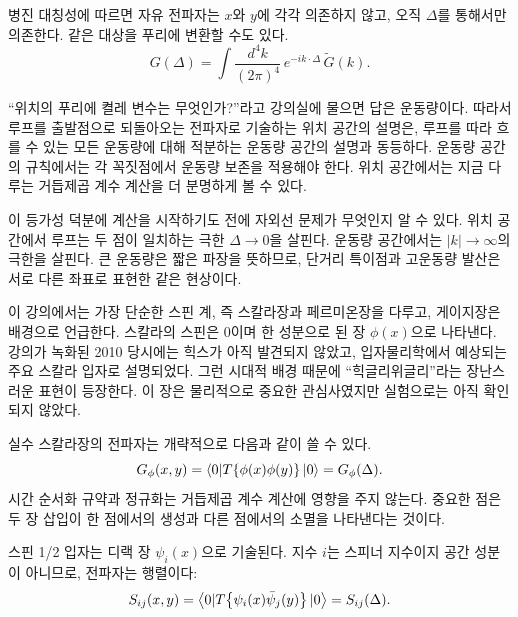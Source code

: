 병진 대칭성에 따르면 자유 전파자는 \(x\)와 \(y\)에 각각 의존하지 않고, 오직 \(\Delta\)를 통해서만 의존한다. 같은 대상을 푸리에 변환할 수도 있다.
\begin{equation}
G(\Delta)
=\int\frac{d^4k}{(2\pi)^4}\,e^{-ik\cdot\Delta}\,\widetilde G(k).
\end{equation}

``위치의 푸리에 켤레 변수는 무엇인가?''라고 강의실에 물으면 답은 운동량이다. 따라서 루프를 출발점으로 되돌아오는 전파자로 기술하는 위치 공간의 설명은, 루프를 따라 흐를 수 있는 모든 운동량에 대해 적분하는 운동량 공간의 설명과 동등하다. 운동량 공간의 규칙에서는 각 꼭짓점에서 운동량 보존을 적용해야 한다. 위치 공간에서는 지금 다루는 거듭제곱 계수 계산을 더 분명하게 볼 수 있다.

이 등가성 덕분에 계산을 시작하기도 전에 자외선 문제가 무엇인지 알 수 있다. 위치 공간에서 루프는 두 점이 일치하는 극한 \(\Delta\to0\)을 살핀다. 운동량 공간에서는 \(|k|\to\infty\)의 극한을 살핀다. 큰 운동량은 짧은 파장을 뜻하므로, 단거리 특이점과 고운동량 발산은 서로 다른 좌표로 표현한 같은 현상이다.

이 강의에서는 가장 단순한 스핀 계, 즉 스칼라장과 페르미온장을 다루고, 게이지장은 배경으로 언급한다. 스칼라의 스핀은 0이며 한 성분으로 된 장 \(\phi(x)\)으로 나타낸다. 강의가 녹화된 2010 당시에는 힉스가 아직 발견되지 않았고, 입자물리학에서 예상되는 주요 스칼라 입자로 설명되었다. 그런 시대적 배경 때문에 ``힉글리위글리''라는 장난스러운 표현이 등장한다. 이 장은 물리적으로 중요한 관심사였지만 실험으로는 아직 확인되지 않았다.

실수 스칼라장의 전파자는 개략적으로 다음과 같이 쓸 수 있다.
\begin{equation}
G_\phi(x,y)=\left\langle0|T\!\left\{\phi(x)\phi(y)\right\}|0\right\rangle
=G_\phi(\Delta).
\end{equation}
시간 순서화 규약과 정규화는 거듭제곱 계수 계산에 영향을 주지 않는다. 중요한 점은 두 장 삽입이 한 점에서의 생성과 다른 점에서의 소멸을 나타낸다는 것이다.

\begin{classroomqa}
\end{classroomqa}

스핀 1/2 입자는 디랙 장 \(\psi_i(x)\)으로 기술된다. 지수 \(i\)는 스피너 지수이지 공간 성분이 아니므로, 전파자는 행렬이다:
\begin{equation}
S_{ij}(x,y)=\left\langle0|T\!\left\{\psi_i(x)\bar\psi_j(y)\right\}|0\right\rangle
=S_{ij}(\Delta).
\end{equation}

